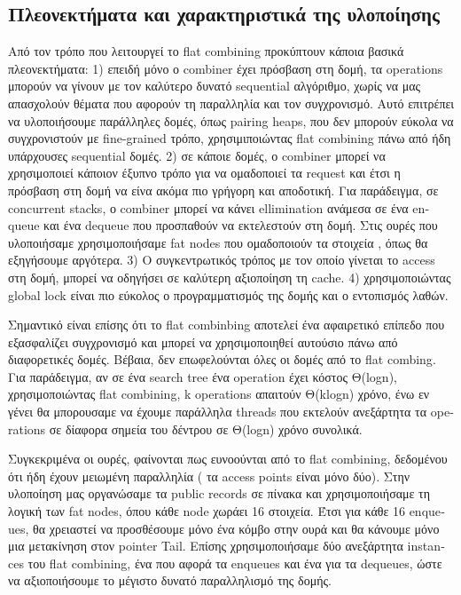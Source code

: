 
\subsection{Πλεονεκτήματα και χαρακτηριστικά της υλοποίησης}
Από τον τρόπο που λειτουργεί το \textlatin{flat combining} προκύπτουν κάποια βασικά πλεονεκτήματα:
1) επειδή μόνο ο \textlatin{combiner} έχει πρόσβαση στη δομή, τα \textlatin{operations} μπορούν να γίνουν με τον καλύτερο δυνατό \textlatin{sequential} αλγόριθμο, χωρίς να μας απασχολούν θέματα που αφορούν τη παραλληλία και τον συγχρονισμό. Αυτό επιτρέπει να υλοποιήσουμε παράλληλες δομές, όπως \textlatin{pairing heaps}, που δεν μπορούν εύκολα να συγχρονιστούν με \textlatin{fine-grained} τρόπο, χρησιμιποιώντας \textlatin{flat combining} πάνω από ήδη υπάρχουσες \textlatin{sequential} δομές.
2) σε κάποιε δομές, ο \textlatin{combiner} μπορεί να χρησιμοποιεί κάποιον έξυπνο τρόπο για να ομαδοποιεί τα \textlatin{request} και έτσι η πρόσβαση στη δομή να είνα ακόμα πιο γρήγορη και αποδοτική. Για παράδειγμα, σε \textlatin{concurrent stacks}, ο \textlatin{combiner} μπορεί να κάνει \textlatin{ellimination} ανάμεσα σε ένα \textlatin{enqueue} και ένα \textlatin{dequeue} που προσπαθούν να εκτελεστούν στη δομή. Στις ουρές που υλοποιήσαμε χρησιμοποιήσαμε \textlatin{fat nodes} που ομαδοποιούν τα στοιχεία , όπως θα εξηγήσουμε αργότερα.
3) Ο συγκεντρωτικός τρόπος με τον οποίο γίνεται το \textlatin{access} στη δομή, μπορεί να οδηγήσει σε καλύτερη αξιοποίηση τη \textlatin{cache}.
4) χρησιμοποιώντας \textlatin{global lock} είναι πιο εύκολος ο προγραμματισμός της δομής και ο εντοπισμός λαθών.

Σημαντικό είναι επίσης ότι το \textlatin{flat combinbing} αποτελεί ένα αφαιρετικό επίπεδο που εξασφαλίζει συγχρονισμό και μπορεί να χρησιμοποιηθεί αυτούσιο  πάνω από διαφορετικές δομές. Βέβαια, δεν επωφελούνται όλες οι δομές από το \textlatin{flat combing}. Για παράδειγμα, αν σε ένα \textlatin{search tree} ένα \textlatin{operation} έχει κόστος Θ(\textlatin{logn}), χρησιμοποιώντας \textlatin{flat combining, k} operations απαιτούν Θ(\textlatin{klogn}) χρόνο, ένω εν γένει θα μπορουσαμε να έχουμε παράλληλα \textlatin{threads} που εκτελούν ανεξάρτητα τα \textlatin{operations} σε δίαφορα σημεία του δέντρου σε Θ(\textlatin{logn}) χρόνο συνολικά.

Συγκεκριμένα οι ουρές, φαίνονται πως ευνοούνται από το \textlatin{flat combining}, δεδομένου ότι ήδη έχουν μειωμένη παραλληλία ( τα \textlatin{access points} είναι μόνο δύο). Στην υλοποίηση μας οργανώσαμε τα \textlatin{public records} σε πίνακα και χρησιμοποιήσαμε τη λογική των \textlatin{fat nodes}, όπου κάθε node χωράει 16 στοιχεία. Έτσι για κάθε 16 \textlatin{enqueues}, θα χρειαστεί να προσθέσουμε μόνο ένα κόμβο στην ουρά και θα κάνουμε μόνο μια μετακίνηση στον \textlatin{pointer Tail}. Επίσης χρησιμοποιήσαμε δύο ανεξάρτητα \textlatin{instances} του \textlatin{flat combining}, ένα που αφορά τα \textlatin{enqueues} και ένα για τα \textlatin{dequeues}, ώστε να αξιοποιήσουμε το μέγιστο δυνατό παραλληλισμό της δομής. 

